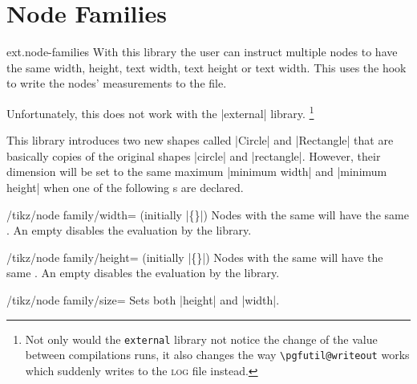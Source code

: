 %
%
%
\section{Node Families}
\begin{tikzlibrary}{ext.node-families}
  With this library the user can instruct multiple nodes to have the same
  width, height, text width, text height or text width.
  This uses the hook  to write the nodes'
  measurements to the  file.
  
  Unfortunately, this does not work with the |external| library.%
  \footnote{Not only would the \texttt{external} library not notice the change of the value between compilations runs,
    it also changes the way \texttt{\textbackslash pgfutil@writeout} works which suddenly writes to the \textsc{log} file instead.}
\end{tikzlibrary}

This library introduces two new shapes called |Circle| and |Rectangle|
that are basically copies of the original shapes |circle| and |rectangle|.
However, their dimension will be set to the same maximum |minimum width| and |minimum height|
when one of the following s are declared.
\begin{key}{/tikz/node family/width= (initially |\{\}|)}
Nodes with the same  will have the same .
An empty  disables the evaluation by the library.
\begin{codeexample}[preamble=\usetikzlibrary{positioning,ext.node-families},/tikz/node distance=.5cm]
\tikzexternaldisable %
\end{codeexample}
\end{key}
\begin{key}{/tikz/node family/height= (initially |\{\}|)}
Nodes with the same  will have the same .
An empty  disables the evaluation by the library.
\end{key}
\begin{key}{/tikz/node family/size=}
Sets both |height| and |width|.
\end{key}

